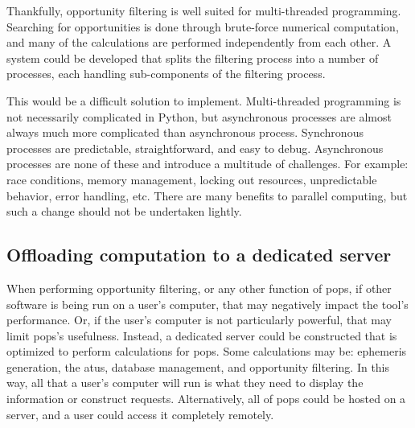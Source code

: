 Thankfully, opportunity filtering is well suited for multi-threaded
programming. Searching for opportunities is done through brute-force numerical
computation, and many of the calculations are performed independently from each
other. A system could be developed that splits the filtering process into a
number of processes, each handling sub-components of the filtering process. 

This would be a difficult solution to implement. Multi-threaded programming is
not necessarily complicated in Python, but asynchronous processes are almost
always much more complicated than asynchronous process. Synchronous processes
are predictable, straightforward, and easy to debug. Asynchronous processes are
none of these and introduce a multitude of challenges. For example: race
conditions, memory management, locking out resources, unpredictable behavior,
error handling, etc.  There are many benefits to parallel computing, but such a
change should not be undertaken lightly.


\subsection{Offloading computation to a dedicated server}

When performing opportunity filtering, or any other function of \gls{pops}, if
other software is being run on a user's computer, that may negatively impact
the tool's performance. Or, if the user's computer is not particularly
powerful, that may limit \gls{pops}'s usefulness. Instead, a dedicated server
could be constructed that is optimized to perform calculations for \gls{pops}.
Some calculations may be: ephemeris generation, the \glspl{atu}, database
management, and opportunity filtering. In this way, all that a user's computer
will run is what they need to display the information or construct requests.
Alternatively, all of \gls{pops} could be hosted on a server, and a user could
access it completely remotely. 

